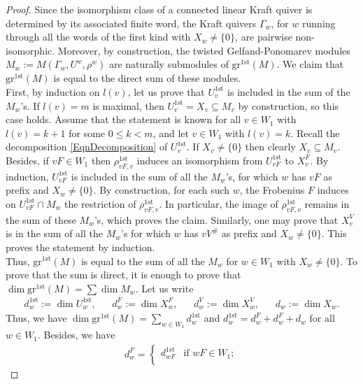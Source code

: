 \documentclass[12pt]{amsart}
\theoremstyle{definition}
\newcommand{\<}{\langle}   %
\renewcommand{\>}{\rangle} %
\begin{document}
\begin{proof}
    Since the isomorphism class of a connected linear Kraft quiver is determined by its associated finite word, the Kraft quivers $\Gamma_w$, for $w$ running through all the words of the first kind with $X_w \not = \{0\}$, are pairwise non-isomorphic. Moreover, by construction, the twisted Gelfand-Ponomarev modules $M_w := M(\Gamma_w,U^w,\rho^w)$ are naturally submodules of $\mathrm{gr}^{1\mathrm{st}}(M)$. We claim that $\mathrm{gr}^{1\mathrm{st}}(M)$ is equal to the direct sum of these modules.\\
    First, by induction on $l(v)$, let us prove that $U_{v}^{1\mathrm{st}}$ is included in the sum of the $M_w$'s. If $l(v) = m$ is maximal, then $U_{v}^{1\mathrm{st}} = X_v \subseteq  M_v$ by construction, so this case holds. Assume that the statement is known for all $v \in W_1$ with $l(v) = k+1$ for some $0 \leq k < m$, and let $v \in W_1$ with $l(v) = k$. Recall the decomposition \eqref{EqnDecomposition} of $U_{v}^{1\mathrm{st}}$. If $X_v \not = \{0\}$ then clearly $X_v \subseteq  M_v$. Besides, if $vF \in W_1$ then $\rho_{vF,v}^{1\mathrm{st}}$ induces an isomorphism from $U_{vF}^{1\mathrm{st}}$ to $X_v^F$. By induction, $U_{vF}^{1\mathrm{st}}$ is included in the sum of all the $M_w$'s, for which $w$ has $vF$ as prefix and $X_w \not = \{0\}$. By construction, for each such $w$, the Frobenius $F$ induces on $U_{vF}^{1\mathrm{st}}\cap M_w$ the restriction of $\rho_{vF,v}^{1\mathrm{st}}$. In particular, the image of $\rho_{vF,v}^{1\mathrm{st}}$ remains in the sum of these $M_w$'s, which proves the claim. Similarly, one may prove that $X_v^V$ is in the sum of all the $M_w$'s for which $w$ has $vV^{\#}$ as prefix and $X_w \not = \{0\}$. This proves the statement by induction. \\
    Thus, $\mathrm{gr}^{1\mathrm{st}}(M)$ is equal to the sum of all the $M_w$ for $w\in W_1$ with $X_w \not = \{0\}$. To prove that the sum is direct, it is enough to prove that $\dim\mathrm{gr}^{1\mathrm{st}}(M) = \sum \dim M_w$. Let us write 
    \begin{align*}
        d_w^{1\mathrm{st}} := \dim U_{w}^{1\mathrm{st}}, & & d^F_w := \dim X_w^F, & & d^V_w := \dim X_w^V, & & d_w := \dim X_w.
    \end{align*}
    Thus, we have $\dim \mathrm{gr}^{1\mathrm{st}}(M) = \sum_{w \in W_1} d_w^{1\mathrm{st}}$ and $d_w^{1\mathrm{st}} = d_w^F + d_w^F + d_w$ for all $w\in W_1$. Besides, we have 
    \begin{align*}
        d_w^F = \begin{cases}
            d_{wF}^{1\mathrm{st}} & \text{if } wF \in W_1;\\

\end{cases}
\end{align*}
\end{proof}
\end{document}
